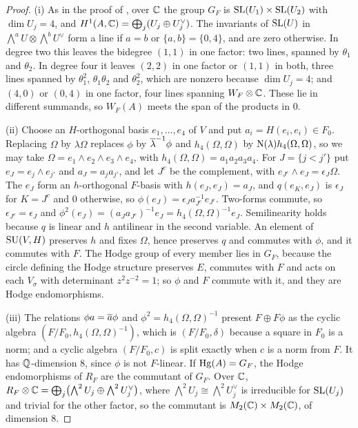\begin{proof}
(i) As in the proof of \cite[Proposition~17.3(iii)]{paperI}, over $\mathbb{C}$ the group $G_{F}$
is $\operatorname{SL}(U_{1})\times\operatorname{SL}(U_{2})$ with $\dim U_{j}=4$, and
$H^{1}(A,\mathbb{C})=\bigoplus_{j}(U_{j}\oplus U_{j}^{\vee})$. The invariants of
$\operatorname{SL}(U)$ in $\bigwedge^{a}U\otimes\bigwedge^{b}U^{\vee}$ form a line if $a=b$
or $\{a,b\}=\{0,4\}$, and are zero otherwise. In degree two this leaves the
bidegree $(1,1)$ in one factor: two lines, spanned by $\theta_{1}$ and
$\theta_{2}$. In degree four it leaves $(2,2)$ in one factor or $(1,1)$ in
both, three lines spanned by $\theta_{1}^{2}$, $\theta_{1}\theta_{2}$ and
$\theta_{2}^{2}$, which are nonzero because $\dim U_{j}=4$; and $(4,0)$ or
$(0,4)$ in one factor, four lines spanning $W_{F}\otimes\mathbb{C}$. These lie in
different summands, so $W_{F}(A)$ meets the span of the products in $0$.

(ii) Choose an $H$-orthogonal basis $e_{1},\dots,e_{4}$ of $V$ and put
$a_{i}=H(e_{i},e_{i})\in F_{0}$. Replacing $\Omega$ by $\lambda\Omega$
replaces $\phi$ by $\overline{\lambda}^{-1}\phi$ and $h_{4}(\Omega,\Omega)$ by
$\mathrm{N}(\lambda)h_{4}(\Omega,\Omega)$, so we may take
$\Omega=e_{1}\wedge e_{2}\wedge e_{3}\wedge e_{4}$, with
$h_{4}(\Omega,\Omega)=a_{1}a_{2}a_{3}a_{4}$. For $J=\{j<j'\}$ put
$e_{J}=e_{j}\wedge e_{j'}$ and $a_{J}=a_{j}a_{j'}$, and let $J^{c}$ be the
complement, with $e_{J^{c}}\wedge e_{J}=\epsilon_{J}\Omega$. The $e_{J}$ form
an $h$-orthogonal $F$-basis with $h(e_{J},e_{J})=a_{J}$, and
$q(e_{K},e_{J})$ is $\epsilon_{J}$ for $K=J^{c}$ and $0$ otherwise, so
$\phi(e_{J})=\epsilon_{J}a_{J^{c}}^{-1}e_{J^{c}}$. Two-forms commute, so
$\epsilon_{J^{c}}=\epsilon_{J}$ and
$\phi^{2}(e_{J})=(a_{J}a_{J^{c}})^{-1}e_{J}=h_{4}(\Omega,\Omega)^{-1}e_{J}$.
Semilinearity holds because $q$ is linear and $h$ antilinear in the second
variable. An element of $\operatorname{SU}(V,H)$ preserves $h$ and fixes $\Omega$, hence
preserves $q$ and commutes with $\phi$, and it commutes with $F$. The Hodge
group of every member lies in $G_{F}$, because the circle defining the Hodge
structure preserves $E$, commutes with $F$ and acts on each $V_{\sigma}$ with
determinant $z^{2}z^{-2}=1$; so $\phi$ and $F$ commute with it, and they are
Hodge endomorphisms.

(iii) The relations $\phi a=\overline{a}\phi$ and $\phi^{2}=h_{4}(\Omega,\Omega)^{-1}$
present $F\oplus F\phi$ as the cyclic algebra
$(F/F_{0},h_{4}(\Omega,\Omega)^{-1})$, which is $(F/F_{0},\delta)$ because a
square in $F_{0}$ is a norm; and a cyclic algebra $(F/F_{0},c)$ is split
exactly when $c$ is a norm from $F$. It has $\mathbb{Q}$-dimension $8$, since $\phi$
is not $F$-linear. If $\operatorname{Hg}(A)=G_{F}$, the Hodge endomorphisms of $R_{F}$ are
the commutant of $G_{F}$. Over $\mathbb{C}$,
$R_{F}\otimes\mathbb{C}=\bigoplus_{j}\bigl(\bigwedge^{2}U_{j}\oplus
\bigwedge^{2}U_{j}^{\vee}\bigr)$, where
$\bigwedge^{2}U_{j}\cong\bigwedge^{2}U_{j}^{\vee}$ is irreducible for
$\operatorname{SL}(U_{j})$ and trivial for the other factor, so the commutant is
$M_{2}(\mathbb{C})\times M_{2}(\mathbb{C})$, of dimension $8$.


\end{proof}
